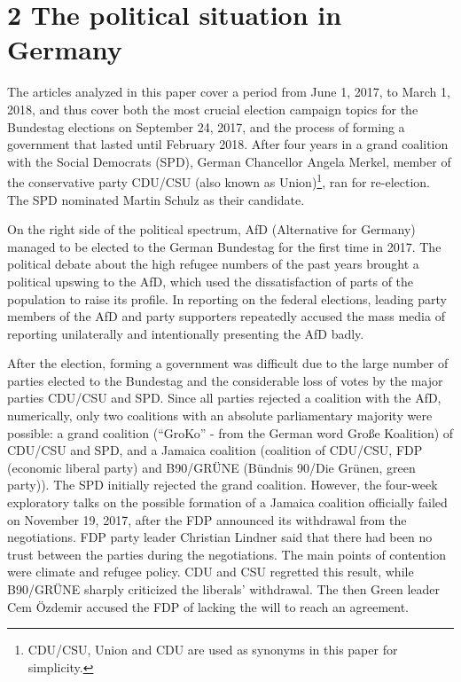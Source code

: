 \documentclass[
  12pt,
]{article}
\begin{document}
\pagebreak

\hypertarget{the-political-situation-in-germany}{%
\section{2 The political situation in
Germany}\label{the-political-situation-in-germany}}

The articles analyzed in this paper cover a period from June 1, 2017, to
March 1, 2018, and thus cover both the most crucial election campaign
topics for the Bundestag elections on September 24, 2017, and the
process of forming a government that lasted until February 2018. After
four years in a grand coalition with the Social Democrats (SPD), German
Chancellor Angela Merkel, member of the conservative party CDU/CSU (also
known as Union)\footnote{CDU/CSU, Union and CDU are used as synonyms in
  this paper for simplicity.}, ran for re-election. The SPD nominated
Martin Schulz as their candidate.

On the right side of the political spectrum, AfD (Alternative for
Germany) managed to be elected to the German Bundestag for the first
time in 2017. The political debate about the high refugee numbers of the
past years brought a political upswing to the AfD, which used the
dissatisfaction of parts of the population to raise its profile. In
reporting on the federal elections, leading party members of the AfD and
party supporters repeatedly accused the mass media of reporting
unilaterally and intentionally presenting the AfD badly.

After the election, forming a government was difficult due to the large
number of parties elected to the Bundestag and the considerable loss of
votes by the major parties CDU/CSU and SPD. Since all parties rejected a
coalition with the AfD, numerically, only two coalitions with an
absolute parliamentary majority were possible: a grand coalition
(``GroKo'' - from the German word Große Koalition) of CDU/CSU and SPD,
and a Jamaica coalition (coalition of CDU/CSU, FDP (economic liberal
party) and B90/GRÜNE (Bündnis 90/Die Grünen, green party)). The SPD
initially rejected the grand coalition. However, the four-week
exploratory talks on the possible formation of a Jamaica coalition
officially failed on November 19, 2017, after the FDP announced its
withdrawal from the negotiations. FDP party leader Christian Lindner
said that there had been no trust between the parties during the
negotiations. The main points of contention were climate and refugee
policy. CDU and CSU regretted this result, while B90/GRÜNE sharply
criticized the liberals' withdrawal. The then Green leader Cem Özdemir
accused the FDP of lacking the will to reach an agreement.
\end{document}
